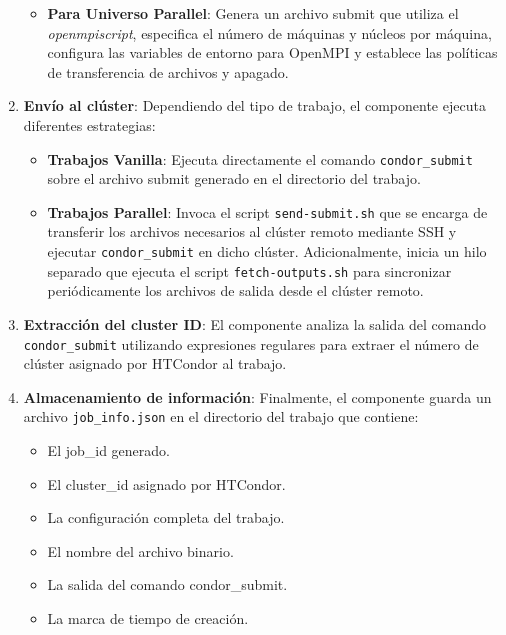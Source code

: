 \begin{enumerate}
\begin{itemize}
		\item \textbf{Para Universo Parallel}: Genera un archivo submit que utiliza el \textit{openmpiscript}, especifica el número de máquinas y núcleos por máquina, configura las variables de entorno para OpenMPI y establece las políticas de transferencia de archivos y apagado.
	\end{itemize}
	
	\item \textbf{Envío al clúster}: Dependiendo del tipo de trabajo, el componente ejecuta diferentes estrategias:
	
	\begin{itemize}
		\item \textbf{Trabajos Vanilla}: Ejecuta directamente el comando \texttt{condor\_submit} sobre el archivo submit generado en el directorio del trabajo.
		
		\item \textbf{Trabajos Parallel}: Invoca el script \texttt{send-submit.sh} que se encarga de transferir los archivos necesarios al clúster remoto mediante SSH y ejecutar \texttt{condor\_submit} en dicho clúster. Adicionalmente, inicia un hilo separado que ejecuta el script \texttt{fetch-outputs.sh} para sincronizar periódicamente los archivos de salida desde el clúster remoto.
	\end{itemize}
	
	\item \textbf{Extracción del cluster ID}: El componente analiza la salida del comando \texttt{condor\_submit} utilizando expresiones regulares para extraer el número de clúster asignado por HTCondor al trabajo.
	
	\item \textbf{Almacenamiento de información}: Finalmente, el componente guarda un archivo \texttt{job\_info.json} en el directorio del trabajo que contiene:
	\begin{itemize}
		\item El job\_id generado.
		\item El cluster\_id asignado por HTCondor.
		\item La configuración completa del trabajo.
		\item El nombre del archivo binario.
		\item La salida del comando condor\_submit.
		\item La marca de tiempo de creación.
	\end{itemize}
\end{enumerate}

